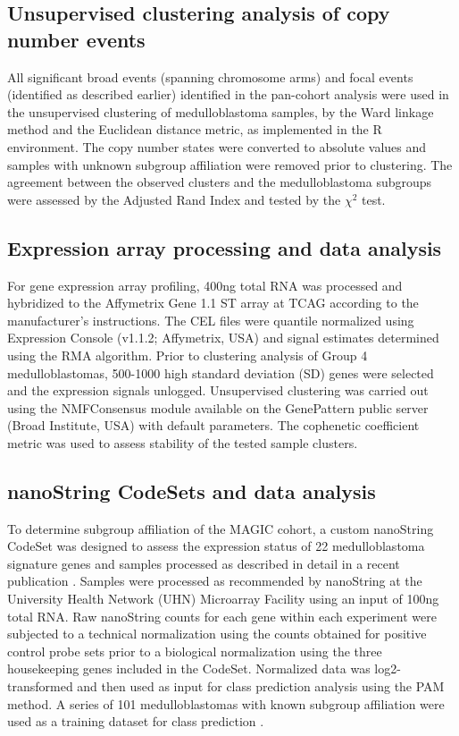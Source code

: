 \subsection{Unsupervised clustering analysis of copy number events}

All significant broad events (spanning chromosome arms) and focal events (identified as described earlier) identified in the pan-cohort analysis were used in the unsupervised clustering of medulloblastoma samples, by the Ward linkage method and the Euclidean distance metric, as implemented in the R environment. The copy number states were converted to absolute values and samples with unknown subgroup affiliation were removed prior to clustering. The agreement between the observed clusters and the medulloblastoma subgroups were assessed by the Adjusted Rand Index and tested by the $\chi^2$ test.

\subsection{Expression array processing and data analysis}

For gene expression array profiling, 400ng total RNA was processed and hybridized to the Affymetrix Gene 1.1 ST array at TCAG according to the manufacturer’s instructions. The CEL files were quantile normalized using Expression Console (v1.1.2; Affymetrix, USA) and signal estimates determined using the RMA algorithm.  Prior to clustering analysis of Group 4 medulloblastomas, 500-1000 high standard deviation (SD) genes were selected and the expression signals unlogged.  Unsupervised clustering was carried out using the NMFConsensus module available on the GenePattern public server (Broad Institute, USA) with default parameters.  The cophenetic coefficient metric was used to assess stability of the tested sample clusters.

\subsection{nanoString CodeSets and data analysis}

To determine subgroup affiliation of the MAGIC cohort, a custom nanoString CodeSet was designed to assess the expression status of 22 medulloblastoma signature genes and samples processed as described in detail in a recent publication .  Samples were processed as recommended by nanoString at the University Health Network (UHN) Microarray Facility using an input of 100ng total RNA.  Raw nanoString counts for each gene within each experiment were subjected to a technical normalization using the counts obtained for positive control probe sets prior to a biological normalization using the three housekeeping genes included in the CodeSet. Normalized data was log2-transformed and then used as input for class prediction analysis using the PAM method.  A series of 101 medulloblastomas with known subgroup affiliation were used as a training dataset for class prediction .

